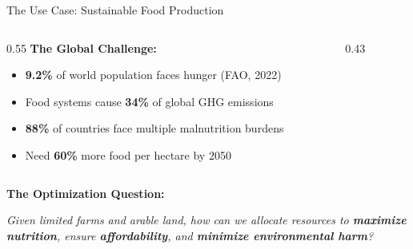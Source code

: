 \documentclass[aspectratio=169,10pt]{beamer}
\begin{document}
\begin{frame}{The Use Case: Sustainable Food Production}
    \vspace{-0.6cm}
    
    \begin{columns}[T]
        \begin{column}{0.55\textwidth}
            \small\textbf{The Global Challenge:}
            \begin{itemize}\scriptsize
                \item \textbf{9.2\%} of world population faces hunger (FAO, 2022)
                \item Food systems cause \textbf{34\%} of global GHG emissions
                \item \textbf{88\%} of countries face multiple malnutrition burdens
                \item Need \textbf{60\%} more food per hectare by 2050
            \end{itemize}
            
            
            
            
        \end{column}
        \begin{column}{0.43\textwidth}
            
        \end{column}
    \end{columns}
\vspace{0.4cm}
    \small\textbf{The Optimization Question:}
            \begin{keybox}
            \centering
                 \textit{Given limited farms and arable land, how can we allocate resources to \textbf{maximize nutrition}, ensure \textbf{affordability}, and \textbf{minimize environmental harm}?}
            \end{keybox}
\end{frame}
\end{document}
